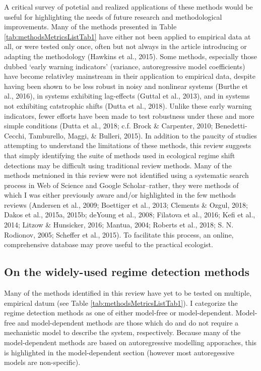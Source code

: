 \documentclass[12pt,twoside,openany]{reedthesis}
\begin{document}
A critical survey of potetial and realized applications of these methods would be useful for highlighting the needs of future research and methodological improvements. Many of the methods presented in Table \ref{tab:methodsMetricsListTab1} have either not been applied to empirical data at all, or were tested only once, often but not always in the article introducing or adapting the methodology (Hawkins et al., 2015). Some methods, especially those dubbed `early warning indicators' (variance, autoregressive model coefficients) have become relativley mainstream in their application to empirical data, despite having been shown to be less robust in noisy and nonlinear systems (Burthe et al., 2016), in systems exhibiting lag-effects (Guttal et al., 2013), and in systems not exhibiting catstrophic shifts (Dutta et al., 2018). Unlike these early warning indicators, fewer efforts have been made to test robustness under these and more simple conditions (Dutta et al., 2018; c.f. Brock \& Carpenter, 2010; Benedetti-Cecchi, Tamburello, Maggi, \& Bulleri, 2015). In addition to the paucity of studies attempting to understand the limitations of these methods, this review suggests that simply identifying the suite of methods used in ecological regime shift detections may be difficult using traditional review methods. Many of the methods metnioned in this review were not identified using a systematic search process in Web of Science and Google Scholar--rather, they were methods of which I was either previously aware and/or highlighted in the few methods reviews (Andersen et al., 2009; Boettiger et al., 2013; Clements \& Ozgul, 2018; Dakos et al., 2015a, 2015b; deYoung et al., 2008; Filatova et al., 2016; Kefi et al., 2014; Litzow \& Hunsicker, 2016; Mantua, 2004; Roberts et al., 2018; S. N. Rodionov, 2005; Scheffer et al., 2015). To facilitate this process, an online, comprehensive database may prove useful to the practical ecologist.

\hypertarget{on-the-widely-used-regime-detection-methods}{%
\subsection{On the widely-used regime detection methods}\label{on-the-widely-used-regime-detection-methods}}

Many of the methods identified in this review have yet to be tested on multiple, empirical datum (see Table \ref{tab:methodsMetricsListTab1}). I categorize the regime detection methods as one of either model-free or model-dependent. Model-free and model-dependent methods are those which do and do not require a mechanistic model to describe the system, respectively. Because many of the model-dependent methods are based on autoregressive modelling apporaches, this is highlighted in the model-dependent section (however most autoregessive models are non-specific).
\end{document}
